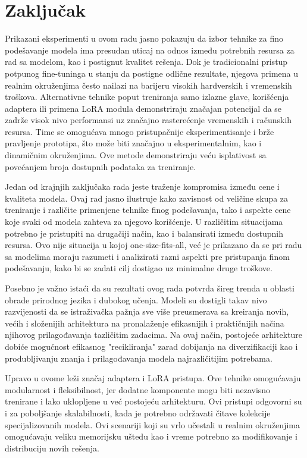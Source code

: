 \documentclass[12pt,oneside]{memoir}
\begin{document}
\chapter{Zaključak}
Prikazani eksperimenti u ovom radu jasno pokazuju da izbor tehnike za fino podešavanje modela ima presudan uticaj na odnos između potrebnih resursa za rad sa modelom, kao i postignut kvalitet rešenja. Dok je tradicionalni pristup potpunog fine-tuninga u stanju da postigne odlične rezultate, njegova primena u realnim okruženjima često nailazi na barijeru visokih hardverskih i vremenskih troškova. Alternativne tehnike poput treniranja samo izlazne glave, korišćenja adaptera ili primena LoRA modula demonstriraju značajan potencijal da se zadrže visok nivo performansi uz značajno rasterećenje vremenskih i računskih resursa. Time se omogućava mnogo pristupačnije eksperimentisanje i brže pravljenje prototipa, što može biti značajno u eksperimentalnim, kao i dinamičnim okruženjima. Ove metode demonstriraju veću isplativost sa povećanjem broja dostupnih podataka za treniranje.

Jedan od krajnjih zaključaka rada jeste traženje kompromisa između cene i kvaliteta modela. Ovaj rad jasno ilustruje kako zavisnost od veličine skupa za treniranje i različite primenjene tehnike finog podešavanja, tako i aspekte cene koje svaki od modela zahteva za njegovo korišćenje. U različitim situacijama potrebno je pristupiti na drugačiji način, kao i balansirati između dostupnih resursa. Ovo nije situacija u kojoj one-size-fits-all, već je prikazano da se pri radu sa modelima moraju razumeti i analizirati razni aspekti pre pristupanja finom podešavanju, kako bi se zadati cilj dostigao uz minimalne druge troškove.

Posebno je važno istaći da su rezultati ovog rada potvrda šireg trenda u oblasti obrade prirodnog jezika i dubokog učenja. Modeli su dostigli takav nivo razvijenosti da se istraživačka pažnja sve više preusmerava sa kreiranja novih, većih i složenijih arhitektura na pronalaženje efikasnijih i praktičnijih načina njihovog prilagođavanja tazličitim zadacima. Na ovaj način, postojeće arhitekture dobiće mogućnost efikasnog "recikliranja" zarad dobijanja na diverzifikaciji kao i produbljivanju znanja i prilagođavanja modela najrazličitijim potrebama. 

Upravo u ovome leži značaj adaptera i LoRA pristupa. Ove tehnike omogućavaju modularnost i fleksibilnost, jer dodatne komponente mogu biti nezavisno trenirane i lako uklopljene u već postojeću arhitekturu. Ovi pristupi odgovorni su i za poboljšanje skalabilnosti, kada je potrebno održavati čitave kolekcije specijalizovanih modela. Ovi scenariji koji su vrlo učestali u realnim okruženjima omogućavaju veliku memorijsku uštedu kao i vreme potrebno za modifikovanje i distribuciju novih rešenja. 
\end{document}
